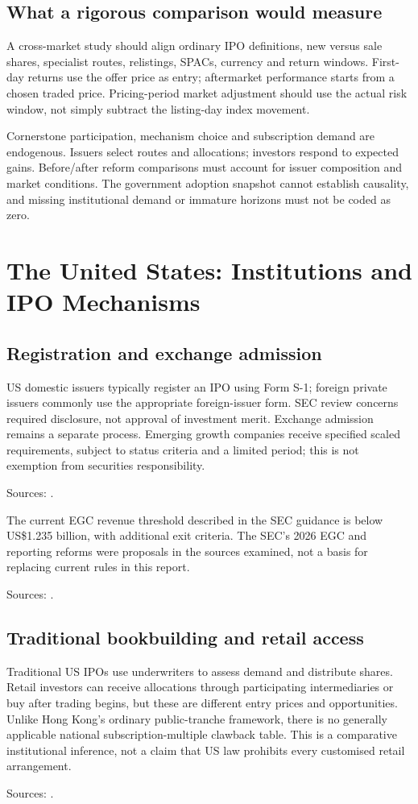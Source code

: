 \documentclass[11pt,a4paper]{article}
\newcommand{\source}[1]{\par{\footnotesize\color{ink}Sources: \cite{#1}.}\par}
\begin{document}
\subsection{What a rigorous comparison would measure}
A cross-market study should align ordinary IPO definitions, new versus sale shares, specialist routes, relistings, SPACs, currency and return windows. First-day returns use the offer price as entry; aftermarket performance starts from a chosen traded price. Pricing-period market adjustment should use the actual risk window, not simply subtract the listing-day index movement.

Cornerstone participation, mechanism choice and subscription demand are endogenous. Issuers select routes and allocations; investors respond to expected gains. Before/after reform comparisons must account for issuer composition and market conditions. The government adoption snapshot cannot establish causality, and missing institutional demand or immature horizons must not be coded as zero.

\section{The United States: Institutions and IPO Mechanisms}
\subsection{Registration and exchange admission}
US domestic issuers typically register an IPO using Form S-1; foreign private issuers commonly use the appropriate foreign-issuer form. SEC review concerns required disclosure, not approval of investment merit. Exchange admission remains a separate process. Emerging growth companies receive specified scaled requirements, subject to status criteria and a limited period; this is not exemption from securities responsibility.\source{usipo,egc,nyseguide}

The current EGC revenue threshold described in the SEC guidance is below US\$1.235 billion, with additional exit criteria. The SEC's 2026 EGC and reporting reforms were proposals in the sources examined, not a basis for replacing current rules in this report.\source{egc,usproposals}

\subsection{Traditional bookbuilding and retail access}
Traditional US IPOs use underwriters to assess demand and distribute shares. Retail investors can receive allocations through participating intermediaries or buy after trading begins, but these are different entry prices and opportunities. Unlike Hong Kong's ordinary public-tranche framework, there is no generally applicable national subscription-multiple clawback table. This is a comparative institutional inference, not a claim that US law prohibits every customised retail arrangement.\source{usipo,usofferings,finra5130,finra5131}
\end{document}
